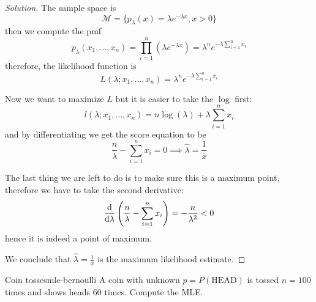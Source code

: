 \documentclass[12pt]{extarticle}
\begin{document}
\begin{proof}[Solution]
    The sample space is
    \begin{equation}
        \mathcal{M} = \{ p_\lambda(x) = \lambda e^{-\lambda x}, x > 0 \}
    \end{equation}
    then we compute the pmf
    \begin{equation}
        p_\lambda (x_1, \dots, x_n) = \prod_{i = 1}^n (\lambda e^{-\lambda x}) = \lambda^n e^{-\lambda \sum_{i = 1}^n x_i}
    \end{equation}
    therefore, the likelihood function is
    \begin{equation}
        L(\lambda; x_1, \dots, x_n) = \lambda^n e^{-\lambda \sum_{i = 1}^n x_i}
    \end{equation}

    Now we want to maximize $L$ but it is easier to take the $\log$ first:
    \begin{equation}
        l(\lambda; x_1, \dots, x_n) = n\log(\lambda) + \lambda \sum_{i = 1}^n x_i
    \end{equation}
    and by differentiating we get the score equation to be
    \begin{equation}
        \frac{n}{\lambda} - \sum_{i = 1}^{n} x_i = 0
        \implies \hat \lambda = \frac{1}{\bar{x}}
    \end{equation}

    The last thing we are left to do is to make sure this is a maximum point, therefore we have to take the second derivative:
    \begin{equation}
        \dv{}{\lambda} \left( \frac{n}{\lambda} - \sum_{i = 1}^{n} x_i \right) = -\frac{n}{\lambda^2} < 0
    \end{equation}
    hence it is indeed a point of maximum.

    We conclude that $\hat \lambda = \frac{1}{\bar{x}}$ is the maximum likelihood estimate.
\end{proof}


\begin{example}{Coin tosses}{mle-bernoulli}
    A coin with unknown $p = P(\text{HEAD})$ is tossed $n = 100$ times and shows heads $60$ times.
    Compute the MLE.
\end{example}
\end{document}

